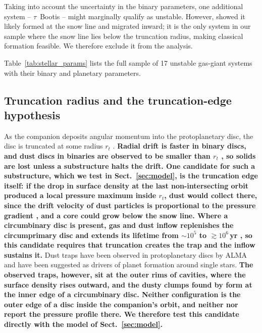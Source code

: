 \documentclass{aa}
\newcommand{\rev}[1]{{\color{red}\textbf{#1}}}
\begin{document}
Taking into account the uncertainty in the binary parameters, one
additional system -- $\tau$~Bootis -- might marginally qualify as
unstable. However, \citet{Justesen2019} showed it likely formed at the
snow line and migrated inward; it is the only system in our sample where
the snow line lies below the truncation radius, making classical
formation feasible. We therefore exclude it from the analysis.

Table~\ref{tab:stellar_params} lists the full sample of 17 unstable
gas-giant systems with their binary and planetary parameters.

\subsection{Truncation radius and the truncation-edge hypothesis}
\label{sec:mechanism}

As the companion deposits angular momentum into the protoplanetary disc,
the disc is truncated at some radius $r_t$
\citep{Goldreich1979, Goldreich1980, Artymowicz1994, Miranda2015,
Manara2019A&A...628A..95M}. \rev{Radial drift is faster in binary discs,
and dust discs in binaries are observed to be smaller than $r_t$
\citep{Zagaria2021, Zagaria2021b}, so solids are lost unless a
substructure halts the drift. One candidate for such a substructure,
which we test in Sect.~\ref{sec:model}, is the truncation edge itself: if the drop in
surface density at the last non-intersecting orbit produced a local
pressure maximum inside $r_t$, dust would collect there, since the drift
velocity of dust particles is proportional to the pressure gradient
\citep{Whipple1972, Weidenschilling1977}, and a core could grow below the
snow line. Where a circumbinary disc is present, gas and dust inflow
replenishes the circumprimary disc and extends its lifetime from
$\sim10^5$ to $\gtrsim10^6$\,yr \citep{Marzari2025, Marzari2025b,
Ronco2026}, so this candidate requires that truncation creates the trap
and the inflow sustains it.} Dust traps have been observed in
protoplanetary discs by ALMA \citep{van_der_Marel2013, Cazzoletti2018,
Stadler_2025} and have been suggested as drivers of planet formation
around single stars. \rev{The observed traps, however, sit at the outer
rims of cavities, where the surface density rises outward, and the dusty
clumps found by \citet{Poblete2019} form at the inner edge of a
circumbinary disc. Neither configuration is the outer edge of a disc
inside the companion's orbit, and neither \citet{Marzari2025} nor
\citet{Marzari2025b} report the pressure profile there. We therefore
test this candidate directly with the model of Sect.~\ref{sec:model}.}
\end{document}
